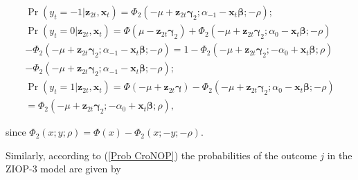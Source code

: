 \documentclass[letterpaper,fleqn,12pt]{article}
\begin{document}
\begin{flushleft}
\begin{equation}
\begin{array}{l}
\Pr (y_{t}=-1|\mathbf{z}_{2t},\mathbf{x}_{t})=\Phi _{2}(-\mu +\mathbf{z}_{2t}%
\mathbf{\gamma }_{2};\alpha _{-1}-\mathbf{x}_{t}\mathbf{\beta };\mathbf{-}%
\rho ); \\ 
\Pr (y_{t}=0|\mathbf{z}_{2t},\mathbf{x}_{t})=\Phi (\mu -\mathbf{z}_{2t}%
\mathbf{\gamma }_{2})+\Phi _{2}(-\mu +\mathbf{z}_{2t}\mathbf{\gamma }%
_{2};\alpha _{0}-\mathbf{x}_{t}\mathbf{\beta };\mathbf{-}\rho ) \\ 
-\Phi _{2}(-\mu +\mathbf{z}_{2t}\mathbf{\gamma }_{2};\alpha _{-1}-\mathbf{x}%
_{t}\mathbf{\beta };\mathbf{-}\rho )=1-\Phi _{2}(-\mu +\mathbf{z}_{2t}%
\mathbf{\gamma }_{2};-\alpha _{0}+\mathbf{x}_{t}\mathbf{\beta };\rho ) \\ 
-\Phi _{2}(-\mu +\mathbf{z}_{2t}\mathbf{\gamma }_{2};\alpha _{-1}-\mathbf{x}%
_{t}\mathbf{\beta };\mathbf{-}\rho ); \\ 
\Pr (y_{t}=1|\mathbf{z}_{2t},\mathbf{x}_{t})=\Phi (-\mu +\mathbf{z}_{2t}%
\mathbf{\gamma })-\Phi _{2}(-\mu +\mathbf{z}_{2t}\mathbf{\gamma }_{2};\alpha
_{0}-\mathbf{x}_{t}\mathbf{\beta };\mathbf{-}\rho ) \\ 
=\Phi _{2}(-\mu +\mathbf{z}_{2t}\mathbf{\gamma }_{2};-\alpha _{0}+\mathbf{x}%
_{t}\mathbf{\beta };\rho ),%
\end{array}
\label{Prob spec ZIOP-2}
\end{equation}
\end{flushleft}

\noindent since $\Phi _{2}(x;y;\rho )=\Phi (x)-\Phi _{2}(x;-y;-\rho )$.

Similarly, according to (\ref{Prob CroNOP}) the probabilities of the outcome 
$j$ in the ZIOP-3 model are given by
\end{document}
